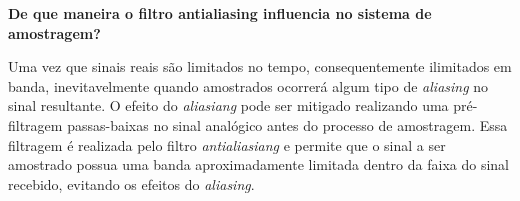 \textbf{De que maneira o filtro antialiasing influencia no sistema de amostragem?}

Uma vez que sinais reais são limitados no tempo, consequentemente ilimitados em banda, inevitavelmente quando amostrados ocorrerá algum tipo de \textit{aliasing} no sinal resultante. O efeito do \textit{aliasiang} pode ser mitigado realizando uma pré-filtragem passas-baixas no sinal analógico antes do processo de amostragem. Essa filtragem é realizada pelo filtro \textit{antialiasiang} e permite que o sinal a ser amostrado possua uma banda aproximadamente limitada dentro da faixa do sinal recebido, evitando os efeitos do \textit{aliasing}.



